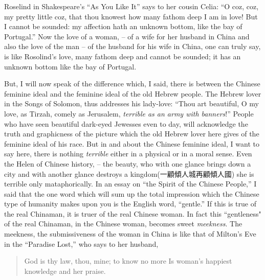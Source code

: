 Roselind in Shakespeare's ``As You Like It'' says to her cousin Celia:
``O coz, coz, my pretty little coz, that thou knowest how many
fathom deep I am in love! But I cannot be sounded: my affection hath an unknown bottom, like the bay of Portugal.''
Now the love of a woman,
-- of a wife for her husband in China and also the love of the man
-- of the husband for his wife in China, one can truly say,
is like Rosolind's love, many fathom deep and cannot be sounded;
it has an unknown bottom like the bay of Portugal.

But, I will now speak of the difference which, I said,
there is between the Chinese feminine ideal and the feminine ideal of the old Hebrew people.
The Hebrew lover in the Songs of Solomon, thus addresses his lady-love:
``Thou art beautiful, O my love, as Tirzah, comely as Jerusalem,
\emph{terrible as an army with banners}!''
People who have seen beautiful dark-eyed Jewesses even to day,
will acknowledge the truth and graphicness of the picture
which the old Hebrew lover here gives of the feminine ideal of his race.
But in and about the Chinese feminine ideal,
I want to say here, there is nothing \emph{terrible} either in a physical or in a moral sense.
Even the Helen of Chinese history,
-- the beauty, who with one glance brings down a city and with another glance destroys a kingdom(一顧傾人城再顧傾人國) she is terrible only mataphorically.
In an essay on ``the Spirit of the Chinese People,''
I said that the one word which will sum up the total impression
which the Chinese type of humanity makes upon you is the English word, ``gentle.''
If this is true of the real Chinaman, it is truer of the real Chinese woman.
In fact this ``gentleness" of the real Chinaman, in the Chinese woman,
becomes sweet \emph{meekness}.
The meekness, the submissiveness of the woman in China is like that of Milton's Eve in the ``Paradise Lost,''
who says to her husband,

\begin{quote}
God is thy law, thou, mine; to know no more
Is woman's happiest knowledge and her praise.
\end{quote}


